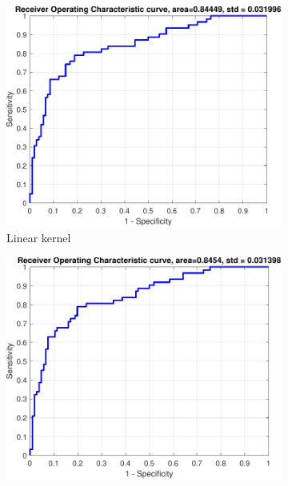 \documentclass{article}
\begin{document}
        \begin{figure}[h]
             \centering
             \begin{subfigure}[b]{0.3\textwidth}
                 \centering
                 \includegraphics[width=\textwidth]{Assignment 1/figures/diabetes_linear_classifier_roc.pdf}
                \caption{Linear kernel}
                 \label{fig:diabetes_liner_roc}
             \end{subfigure}
             \hfill
             \begin{subfigure}[b]{0.3\textwidth}
                 \centering
                 \includegraphics[width=\textwidth]{Assignment 1/figures/diabetes_rbf_classifier_roc.pdf}

\end{subfigure}
\end{figure}
\end{document}
